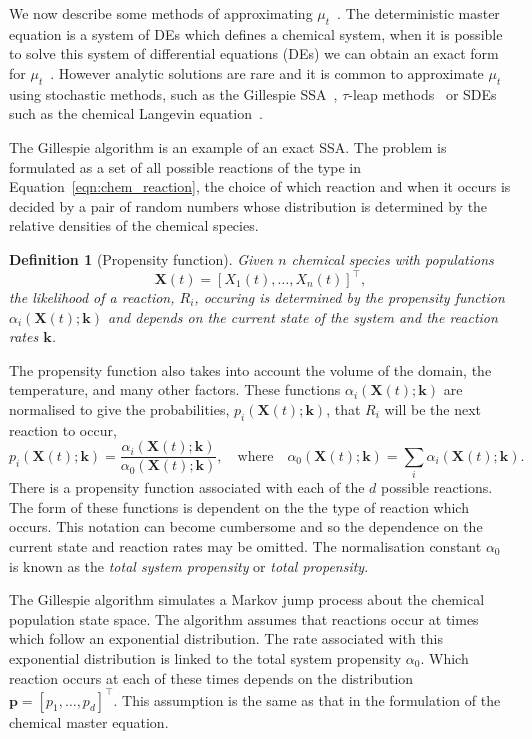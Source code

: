 \documentclass[final]{siamltex}
\newtheorem{dfn}{Definition}[section]
\begin{document}
We now describe some methods of approximating $\mu_t$~\cite{gillespie1991markov}. The deterministic master equation is a system of DEs which defines a chemical system, when it is possible to solve this system of differential equations (DEs) we can obtain an exact form for $\mu_t$~\cite{anderson2016product,jahnke2007solving,anderson2010product}. However analytic solutions are rare and it is common to approximate $\mu_t$ using stochastic methods, such as the Gillespie SSA~\cite{gillespie1977exact}, $\tau$-leap methods~\cite{cao2006efficient,cao2005avoiding,chatterjee2005binomial} or SDEs such as the chemical Langevin equation~\cite{gillespie2000chemical}.


The Gillespie algorithm is an example of an exact SSA. The problem is formulated as a set of all possible reactions of the type in Equation~\eqref{eqn:chem_reaction}, the choice of which reaction and when it occurs is decided by a pair of random numbers whose distribution is determined by the relative densities of the chemical species.

\begin{dfn}[Propensity function]
Given $n$ chemical species with populations
\[
	\mathbf{X}(t) = [X_1(t),\dots,X_n(t)]^\top,
\]
the likelihood of a reaction, $R_i$, occuring is determined by the \emph{propensity function} $\alpha_i(\mathbf{X}(t); \mathbf{k})$ and depends on the current state of the system and the reaction rates $\mathbf{k}$.
\end{dfn}

The propensity function also takes into account the volume of the domain, the temperature, and many other factors. These functions $\alpha_i(\mathbf{X}(t);\mathbf{k})$ are normalised to give the probabilities, $p_i(\mathbf{X}(t);\mathbf{k})$, that $R_i$ will be the next reaction to occur,
\[
	p_i(\mathbf{X}(t); \mathbf{k}) = \frac{\alpha_i(\mathbf{X}(t);\mathbf{k})}{\alpha_0(\mathbf{X}(t);\mathbf{k})}, \quad \text{where} \quad \alpha_0(\mathbf{X}(t);\mathbf{k}) = \sum_i \! \alpha_i(\mathbf{X}(t);\mathbf{k}).
\]
There is a propensity function associated with each of the $d$ possible reactions. The form of these functions is dependent on the the type of reaction which occurs. This notation can become cumbersome and so the dependence on the current state and reaction rates may be omitted. The normalisation constant $\alpha_0$ is known as the \emph{total system propensity} or \emph{total propensity}.

The Gillespie algorithm simulates a Markov jump process about the chemical population state space. The algorithm assumes that reactions occur at times which follow an exponential distribution. The rate associated with this exponential distribution is linked to the total system propensity $\alpha_0$. Which reaction occurs at each of these times depends on the distribution $\mathbf{p} = [p_1, \dots, p_d]^\top$. This assumption is the same as that in the formulation of the chemical master equation.
\end{document}

